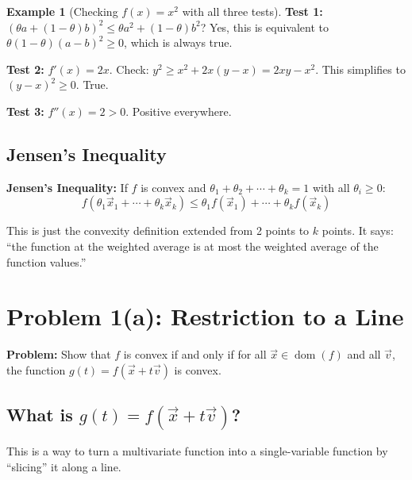\documentclass[10pt]{article}
\theoremstyle{definition}
\newtheorem{example}{Example}
\theoremstyle{plain}
\DeclareMathOperator{\dom}{dom}
\begin{document}
\begin{example}[Checking $f(x) = x^2$ with all three tests]
\mbox{}

\textbf{Test 1:} $(\theta a + (1-\theta)b)^2 \le \theta a^2 + (1-\theta)b^2$? Yes, this is equivalent to $\theta(1-\theta)(a-b)^2 \ge 0$, which is always true.

\textbf{Test 2:} $f'(x) = 2x$. Check: $y^2 \ge x^2 + 2x(y - x) = 2xy - x^2$. This simplifies to $(y-x)^2 \ge 0$. True. \checkmark

\textbf{Test 3:} $f''(x) = 2 > 0$. Positive everywhere. \checkmark
\end{example}

\subsection{Jensen's Inequality}

\begin{result}
\textbf{Jensen's Inequality:} If $f$ is convex and $\theta_1 + \theta_2 + \cdots + \theta_k = 1$ with all $\theta_i \ge 0$:
\[
    f(\theta_1 \vec{x}_1 + \cdots + \theta_k \vec{x}_k) \le \theta_1 f(\vec{x}_1) + \cdots + \theta_k f(\vec{x}_k)
\]
\end{result}

This is just the convexity definition extended from 2 points to $k$ points. It says: ``the function at the weighted average is at most the weighted average of the function values.''

\section{Problem 1(a): Restriction to a Line}

\textbf{Problem:} Show that $f$ is convex if and only if for all $\vec{x} \in \dom(f)$ and all $\vec{v}$, the function $g(t) = f(\vec{x} + t\vec{v})$ is convex.

\subsection{What is $g(t) = f(\vec{x} + t\vec{v})$?}

This is a way to turn a multivariate function into a single-variable function by ``slicing'' it along a line.
\end{document}
